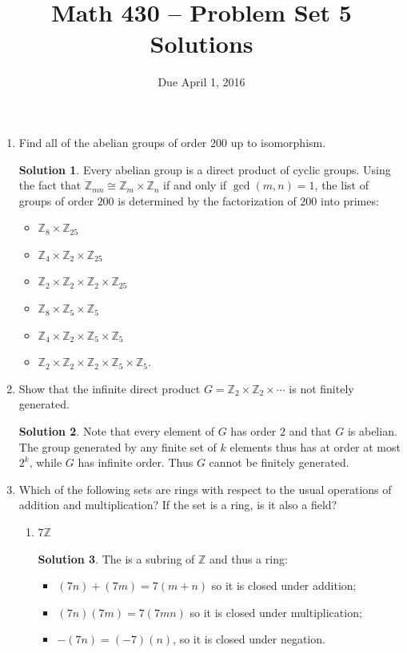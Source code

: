 \documentclass{article}
\title{Math 430 -- Problem Set 5 Solutions}
\date{Due April 1, 2016}
\newcommand{\ZZ}{\mathbb{Z}}
\theoremstyle{definition}
\newtheorem*{solution}{Solution}
\begin{document}
\maketitle


\begin{enumerate}
\item[13.2.] Find all of the abelian groups of order $200$ up to isomorphism.
\begin{solution} 
Every abelian group is a direct product of cyclic groups.  Using the fact that $\ZZ_{mn} \cong \ZZ_m \times \ZZ_n$ if and only if $\gcd(m,n) = 1$, the list of groups of order $200$ is determined by the factorization of $200$ into primes:
\begin{itemize}
\item $\ZZ_8 \times \ZZ_{25}$
\item $\ZZ_4 \times \ZZ_2 \times \ZZ_{25}$
\item $\ZZ_2 \times \ZZ_2 \times \ZZ_2 \times \ZZ_{25}$
\item $\ZZ_8 \times \ZZ_5 \times \ZZ_5$
\item $\ZZ_4 \times \ZZ_2 \times \ZZ_5 \times \ZZ_5$
\item $\ZZ_2 \times \ZZ_2 \times \ZZ_2 \times \ZZ_5 \times \ZZ_5$.
\end{itemize}
\end{solution}
\item[13.5.] Show that the infinite direct product $G = \ZZ_2 \times \ZZ_2 \times \cdots$ is not finitely generated.
\begin{solution}
Note that every element of $G$ has order $2$ and that $G$ is abelian.  The group generated by any finite set of $k$ elements thus has at order at most $2^k$, while $G$ has infinite order.  Thus $G$ cannot be finitely generated.
\end{solution}
\item[16.1.] Which of the following sets are rings with respect to the usual operations of addition and multiplication?  If the set is a ring, is it also a field?
\begin{enumerate}
\item[(a)] $7\ZZ$
\begin{solution}
The is a subring of $\ZZ$ and thus a ring:
\begin{itemize}
\item $(7n) + (7m) = 7(m+n)$ so it is closed under addition;
\item $(7n)(7m) = 7(7mn)$ so it is closed under multiplication;
\item $-(7n) = (-7)(n)$, so it is closed under negation.

\end{itemize}
\end{solution}
\end{enumerate}
\end{enumerate}
\end{document}
